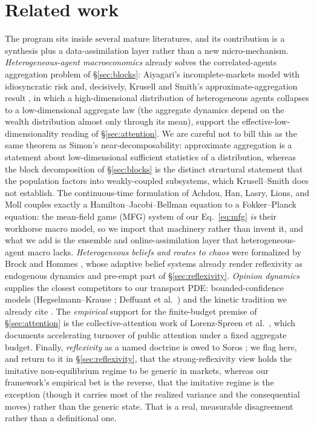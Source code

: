 \documentclass[11pt]{article}
\begin{document}
\section{Related work}
\label{sec:related}

The program sits inside several mature literatures, and its contribution is a synthesis plus a data-assimilation layer rather than a new micro-mechanism. \emph{Heterogeneous-agent macroeconomics} already solves the correlated-agents aggregation problem of \S\ref{sec:blocks}: Aiyagari's incomplete-markets model with idiosyncratic risk \cite{aiyagari1994} and, decisively, Krusell and Smith's approximate-aggregation result \cite{krusellsmith1998}, in which a high-dimensional distribution of heterogeneous agents collapses to a low-dimensional aggregate law (the aggregate dynamics depend on the wealth distribution almost only through its mean), support the effective-low-dimensionality reading of \S\ref{sec:attention}. We are careful not to bill this as the same theorem as Simon's near-decomposability: approximate aggregation is a statement about low-dimensional sufficient statistics of a distribution, whereas the block decomposition of \S\ref{sec:blocks} is the distinct structural statement that the population factors into weakly-coupled subsystems, which Krusell--Smith does not establish. The continuous-time formulation of Achdou, Han, Lasry, Lions, and Moll \cite{achdou2022} couples exactly a Hamilton--Jacobi--Bellman equation to a Fokker--Planck equation: the mean-field game (MFG) system of our Eq.~\eqref{eq:mfg} \emph{is} their workhorse macro model, so we import that machinery rather than invent it, and what we add is the ensemble and online-assimilation layer that heterogeneous-agent macro lacks. \emph{Heterogeneous beliefs and routes to chaos} were formalized by Brock and Hommes \cite{brockhommes1998}, whose adaptive belief systems already render reflexivity as endogenous dynamics and pre-empt part of \S\ref{sec:reflexivity}. \emph{Opinion dynamics} supplies the closest competitors to our transport PDE: bounded-confidence models (Hegselmann--Krause \cite{hegselmannkrause2002}; Deffuant et al.\ \cite{deffuant2000}) and the kinetic tradition we already cite \cite{toscani2006,castellano2009}. The \emph{empirical} support for the finite-budget premise of \S\ref{sec:attention} is the collective-attention work of Lorenz-Spreen et al.\ \cite{lorenzspreen2019}, which documents accelerating turnover of public attention under a fixed aggregate budget. Finally, \emph{reflexivity} as a named doctrine is owed to Soros \cite{soros1987}; we flag here, and return to it in \S\ref{sec:reflexivity}, that the strong-reflexivity view holds the imitative non-equilibrium regime to be generic in markets, whereas our framework's empirical bet is the reverse, that the imitative regime is the exception (though it carries most of the realized variance and the consequential moves) rather than the generic state. That is a real, measurable disagreement rather than a definitional one.
\end{document}
